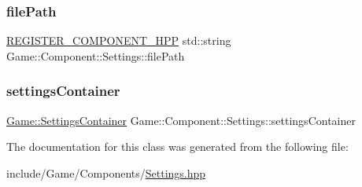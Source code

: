 \subsubsection{\texorpdfstring{file\+Path}{filePath}}
{\footnotesize\ttfamily \mbox{\hyperlink{_core_8hpp_a895cfc16b36b6c309f80b98ded63df4f}{R\+E\+G\+I\+S\+T\+E\+R\+\_\+\+C\+O\+M\+P\+O\+N\+E\+N\+T\+\_\+\+H\+PP}} std\+::string Game\+::\+Component\+::\+Settings\+::file\+Path}

\mbox{\label{class_game_1_1_component_1_1_settings_a89bf0344b96da55d2cac38cda9b2faaa}} 
\subsubsection{\texorpdfstring{settings\+Container}{settingsContainer}}
{\footnotesize\ttfamily \mbox{\hyperlink{class_game_1_1_settings_container}{Game\+::\+Settings\+Container}} Game\+::\+Component\+::\+Settings\+::settings\+Container}



The documentation for this class was generated from the following file\+:\begin{DoxyCompactItemize}
\item 
include/\+Game/\+Components/\mbox{\hyperlink{_settings_8hpp}{Settings.\+hpp}}\end{DoxyCompactItemize}
